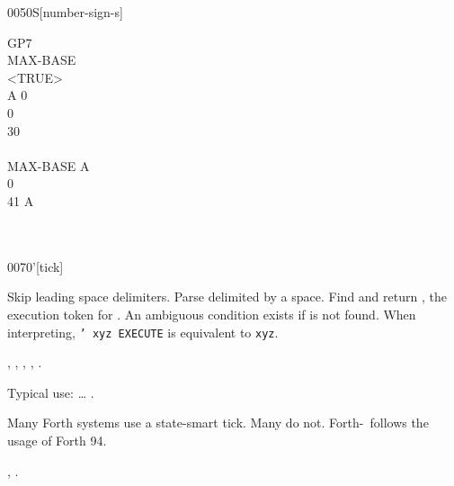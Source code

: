 \begin{worddef}[numS]{0050}{\num{}S}[number-sign-s]
\begin{testing}
		\word{:} GP7 \\
		\tab	{}  		MAX-BASE  \word{!} \\
		\tab	<TRUE> \\
		\tab	A 0  \\
		\tab[2]		 0    \\
		 \word{=}    30 \word{+} \word{=} \word{AND}  \\
		\tab	\word{LOOP} \\
		\tab	MAX-BASE A \word{DO} \\
		\tab[2]		 0   \word{num-end} \\
		 \word{=}   41  A \word{-} \word{+} \word{=}   \\
		\tab	{} \\
		\tab	{}  \word{!} \word{;} \\
	\end{testing}
\end{worddef}


\begin{worddef}{0070}{'}[tick]
\item {}

	Skip leading space delimiters. Parse  delimited by
	a space. Find  and return , the execution
	token for . An ambiguous condition exists if
	 is not found. When interpreting,
	\texttt{' xyz EXECUTE} is equivalent to \texttt{xyz}.

\see {},
	,
	,
	,
	.

	\begin{rationale} %
		Typical use: {\ldots}  .

		Many Forth systems use a state-smart tick. Many do not.
		Forth-\snapshot\ follows the usage of Forth 94.

	\see {},
		.
	\end{rationale}

	\begin{testing} %
		 \\
	\end{testing}
\end{worddef}


